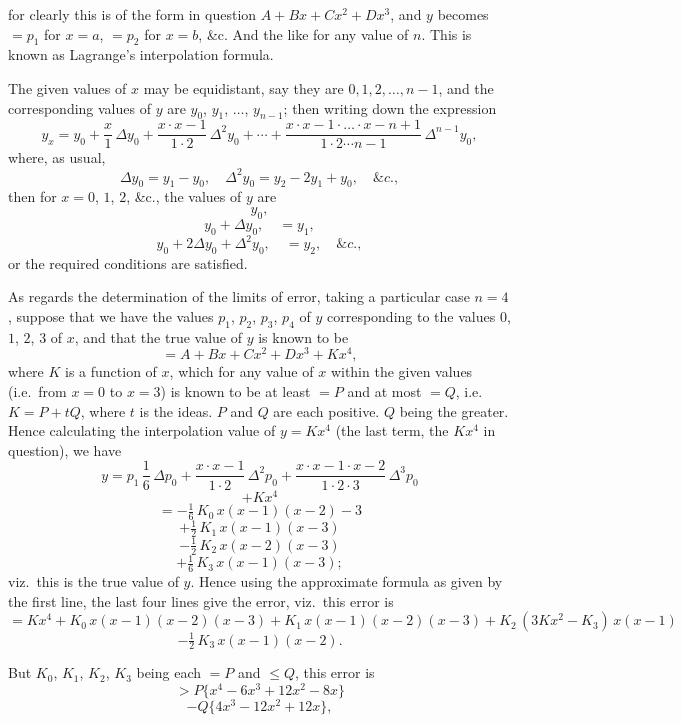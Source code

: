 \documentclass[11pt,a4paper]{article}
\theoremstyle{plain}
\theoremstyle{definition}
\begin{document}
\clearpage

\noindent
for clearly this is of the form in question $A + Bx + Cx^2 + Dx^3$, and $y$ becomes $= p_1$ for
$x = a$, $= p_2$ for $x = b$, \&c.  And the like for any value of $n$.  This is known as Lagrange's
interpolation formula.

The given values of $x$ may be equidistant, say they are $0, 1, 2, \ldots, n - 1$, and the
corresponding values of $y$ are $y_0$, $y_1$, $\ldots$, $y_{n-1}$; then writing down the expression
\[
y_x = y_0 + \frac{x}{1}\,\Delta y_0 + \frac{x \cdot x - 1}{1 \cdot 2}\,\Delta^2 y_0 + \cdots + \frac{x \cdot x - 1 \cdot \ldots \cdot x - n + 1}{1 \cdot 2 \cdots n - 1}\,\Delta^{n-1} y_0,
\]
where, as usual,
\[
\Delta y_0 = y_1 - y_0, \quad \Delta^2 y_0 = y_2 - 2y_1 + y_0, \quad \&c.,
\]
then for $x = 0$, $1$, $2$, \&c., the values of $y$ are
\[
y_0,
\]
\[
y_0 + \Delta y_0, \quad = y_1,
\]
\[
y_0 + 2\Delta y_0 + \Delta^2 y_0, \quad = y_2, \quad \&c.,
\]
or the required conditions are satisfied.

As regards the determination of the limits of error, taking a particular case $n = 4$,
suppose that we have the values $p_1$, $p_2$, $p_3$, $p_4$ of $y$ corresponding to the values
$0$, $1$, $2$, $3$ of $x$, and that the true value of $y$ is known to be
\[
= A + Bx + Cx^2 + Dx^3 + Kx^4,
\]
where $K$ is a function of $x$, which for any value of $x$ within the given values (i.e.\
from $x = 0$ to $x = 3$) is known to be at least $= P$ and at most $= Q$, i.e.\ $K = P + tQ$,
where $t$ is the ideas. $P$ and $Q$ are each positive. $Q$ being the greater. Hence
calculating the interpolation value of $y = Kx^4$ (the last term, the $Kx^4$ in question),
we have
\[
y = p_1\,\frac{1}{6}\,\Delta p_0 + \frac{x \cdot x - 1}{1 \cdot 2}\,\Delta^2 p_0 + \frac{x \cdot x - 1 \cdot x - 2}{1 \cdot 2 \cdot 3}\,\Delta^3 p_0
\]
\[
+ Kx^4
\]
\[
= - \tfrac{1}{6}\,K_0\,x(x-1)(x-2) - 3
\]
\[
+ \tfrac{1}{2}\,K_1\,x(x-1)(x-3)
\]
\[
- \tfrac{1}{2}\,K_2\,x(x-2)(x-3)
\]
\[
+ \tfrac{1}{6}\,K_3\,x(x-1)(x-3);
\]
viz.\ this is the true value of $y$. Hence using the approximate formula as given by
the first line, the last four lines give the error, viz.\ this error is
\[
= Kx^4 + K_0\,x(x-1)(x-2)(x-3) + K_1\,x(x-1)(x-2)(x-3) + K_2\,(3Kx^2 - K_3)\,x(x-1)
\]
\[
- \tfrac{1}{2}\,K_3\,x(x-1)(x-2).
\]

But $K_0$, $K_1$, $K_2$, $K_3$ being each $= P$ and $\leq Q$, this error is
\[
> P\{x^4 - 6x^3 + 12x^2 - 8x\}
\]
\[
- Q\{4x^3 - 12x^2 + 12x\},
\]

\clearpage
\end{document}
